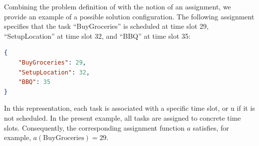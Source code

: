 \begin{example}
      \label{ex:exemplary-assignment}
      Combining the problem definition of  with the notion of an assignment, we provide an example of a possible solution configuration. The following assignment specifies that the task ``BuyGroceries'' is scheduled at time slot 29, ``SetupLocation'' at time slot 32, and ``BBQ'' at time slot 35:
      \begin{lstlisting}[language=json]
{
    "BuyGroceries": 29,
    "SetupLocation": 32,
    "BBQ": 35
}
\end{lstlisting}
      In this representation, each task is associated with a specific time slot, or u if it is not scheduled. In the present example, all tasks are assigned to concrete time slots. Consequently, the corresponding assignment function $a$ satisfies, for example, $a(\text{BuyGroceries}) = 29$.
\end{example}

